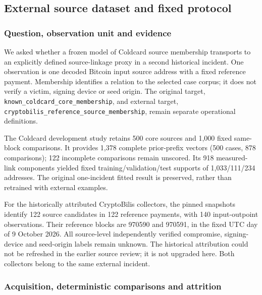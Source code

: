 \begingroup
\setlength{\emergencystretch}{2em}
\subsection{External source dataset and fixed
protocol}\label{external-source-dataset-and-fixed-protocol}

\subsubsection{Question, observation unit and
evidence}\label{question-observation-unit-and-evidence}

We asked whether a frozen model of Coldcard source membership transports
to an explicitly defined source-linkage proxy in a second historical
incident. One observation is one decoded Bitcoin input source address
with a fixed reference payment. Membership identifies a relation to the
selected case corpus; it does not verify a victim, signing device or
seed origin. The original target,
\texttt{known\_\allowbreak{}coldcard\_\allowbreak{}core\_\allowbreak{}membership}, and external target,
\texttt{cryptobilis\_\allowbreak{}reference\_\allowbreak{}source\_\allowbreak{}membership}, remain separate
operational definitions.

The Coldcard development study retains 500 core sources and 1,000 fixed
same-block comparisons. It provides 1,378 complete prior-prefix vectors
(500 cases, 878 comparisons); 122 incomplete comparisons remain
unscored. Its 918 measured-link components yielded fixed
training/validation/test supports of 1,033/111/234 addresses. The
original one-incident fitted result is preserved, rather than retrained
with external examples.

For the historically attributed CryptoBilis collectors, the pinned
snapshots identify 122 source candidates in 122 reference payments, with
140 input-outpoint observations. Their reference blocks are 970590 and
970591, in the fixed UTC day of 9 October 2026. All source-level
independently verified compromise, signing-device and seed-origin labels
remain unknown. The historical attribution could not be refreshed in the
earlier source review; it is not upgraded here. Both collectors belong
to the same external incident.

\subsubsection{Acquisition, deterministic comparisons and
attrition}\label{acquisition-deterministic-comparisons-and-attrition}

